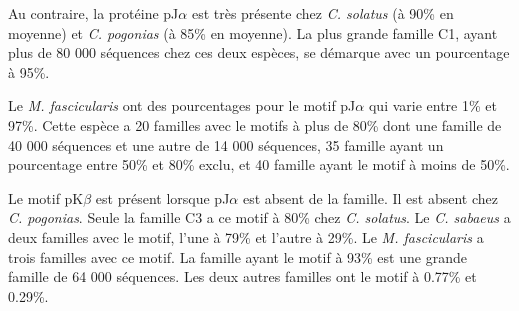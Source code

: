 \documentclass[12pt,a4paper]{article}
\begin{document}
			Au contraire, la protéine pJ$\alpha$ est très présente chez \textit{C. solatus} (à 90\% en moyenne) et \textit{C. pogonias} (à 85\% en moyenne). La plus grande famille C1, ayant plus de 80 000 séquences chez ces deux espèces, se démarque avec un pourcentage à  95\%. 
			
			Le \textit{M. fascicularis} ont des pourcentages pour le motif pJ$\alpha$ qui varie entre 1\% et 97\%. Cette espèce a 20 familles avec le motifs à plus de 80\% dont une famille de  40 000 séquences et une autre de 14 000 séquences, 35 famille ayant un pourcentage entre 50\% et 80\% exclu, et 40 famille ayant le motif à moins de 50\%. 
			
			Le motif pK$\beta$ est présent lorsque pJ$\alpha$ est absent de la famille. Il est absent chez \textit{C. pogonias}. Seule la famille C3 a ce motif à 80\% chez \textit{C. solatus}. Le \textit{C. sabaeus} a deux familles avec le motif, l'une à 79\% et l'autre à 29\%. Le \textit{M. fascicularis} a trois familles avec ce motif. La famille ayant le motif à 93\% est une grande famille de 64 000 séquences. Les deux autres familles ont le motif à 0.77\% et 0.29\%. 
			
\end{document}
